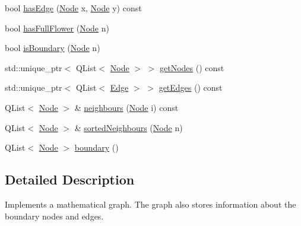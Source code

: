 \begin{DoxyCompactItemize}
\item 
bool \hyperlink{class_circles_1_1_graph_1_1_graph_a55aa662170f9aff4e5daad2632b18801}{has\+Edge} (\hyperlink{namespace_circles_1_1_graph_afab3817d1ee8e2074e82866c27a1058b}{Node} x, \hyperlink{namespace_circles_1_1_graph_afab3817d1ee8e2074e82866c27a1058b}{Node} y) const 
\item 
bool \hyperlink{class_circles_1_1_graph_1_1_graph_ab867cc2c06fb7625e8225f7ea16696a3}{has\+Full\+Flower} (\hyperlink{namespace_circles_1_1_graph_afab3817d1ee8e2074e82866c27a1058b}{Node} n)
\item 
bool \hyperlink{class_circles_1_1_graph_1_1_graph_aba67c754b516f960cb66aeb229a05cb2}{is\+Boundary} (\hyperlink{namespace_circles_1_1_graph_afab3817d1ee8e2074e82866c27a1058b}{Node} n)
\item 
std\+::unique\+\_\+ptr$<$ Q\+List$<$ \hyperlink{namespace_circles_1_1_graph_afab3817d1ee8e2074e82866c27a1058b}{Node} $>$ $>$ \hyperlink{class_circles_1_1_graph_1_1_graph_a6e3b6554943c973fecd2f7e8244f86bb}{get\+Nodes} () const 
\item 
std\+::unique\+\_\+ptr$<$ Q\+List$<$ \hyperlink{class_circles_1_1_graph_1_1_edge}{Edge} $>$ $>$ \hyperlink{class_circles_1_1_graph_1_1_graph_adb0a409de3b4c11758fa7a0de35b9ae7}{get\+Edges} () const 
\item 
Q\+List$<$ \hyperlink{namespace_circles_1_1_graph_afab3817d1ee8e2074e82866c27a1058b}{Node} $>$ \& \hyperlink{class_circles_1_1_graph_1_1_graph_a990cfc808909eaba08c991e1113ac88c}{neighbours} (\hyperlink{namespace_circles_1_1_graph_afab3817d1ee8e2074e82866c27a1058b}{Node} i) const 
\item 
Q\+List$<$ \hyperlink{namespace_circles_1_1_graph_afab3817d1ee8e2074e82866c27a1058b}{Node} $>$ \& \hyperlink{class_circles_1_1_graph_1_1_graph_ac60eea4288fccbc6127d8f05fe8eaadf}{sorted\+Neighbours} (\hyperlink{namespace_circles_1_1_graph_afab3817d1ee8e2074e82866c27a1058b}{Node} n)
\item 
Q\+List$<$ \hyperlink{namespace_circles_1_1_graph_afab3817d1ee8e2074e82866c27a1058b}{Node} $>$ \hyperlink{class_circles_1_1_graph_1_1_graph_aea2f709b91c57039e247fe5a78ea7dac}{boundary} ()
\end{DoxyCompactItemize}


\subsection{Detailed Description}
Implements a mathematical graph. The graph also stores information about the boundary nodes and edges. 

